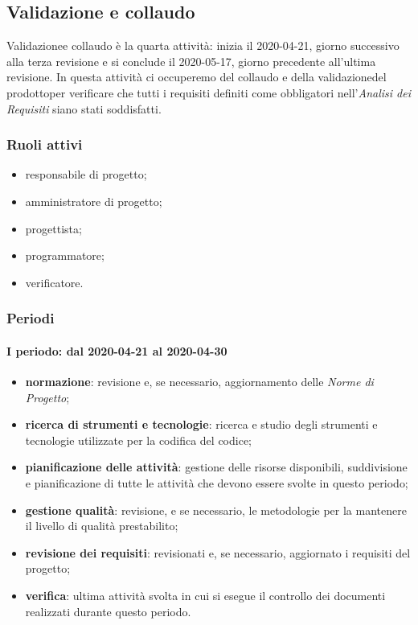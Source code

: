 \subsection{Validazione e collaudo}
Validazione\glosp e collaudo è la quarta attività: inizia il 2020-04-21, giorno successivo alla terza revisione e si conclude il 2020-05-17, giorno precedente all'ultima revisione. In questa attività ci occuperemo del collaudo e della validazione\glosp del prodotto\glosp per verificare che tutti i requisiti definiti come obbligatori nell'\textit{Analisi dei Requisiti} siano stati soddisfatti.

\subsubsection{Ruoli attivi}
\begin{itemize}
	\item responsabile di progetto\glo;
	\item amministratore di progetto\glo;
	\item progettista;
	\item programmatore;
	\item verificatore.
\end{itemize}

\subsubsection{Periodi}
\paragraph*{I periodo: dal 2020-04-21 al 2020-04-30}
\begin{itemize}
	\item \textbf{normazione}: revisione e, se necessario, aggiornamento delle \textit{Norme di Progetto};
	\item \textbf{ricerca di strumenti e tecnologie}: ricerca e studio degli strumenti e tecnologie utilizzate per la codifica del codice;
	\item \textbf{pianificazione delle attività}: gestione delle risorse disponibili, suddivisione e pianificazione di tutte le attività che devono essere svolte in questo periodo;
	\item \textbf{gestione qualità}: revisione, e se necessario, le metodologie per la mantenere il livello di qualità prestabilito;
	\item \textbf{revisione dei requisiti}: revisionati e, se necessario, aggiornato i requisiti del progetto\glo;
	\item \textbf{verifica}: ultima attività svolta in cui si esegue il controllo dei documenti realizzati durante questo periodo.
\end{itemize}

